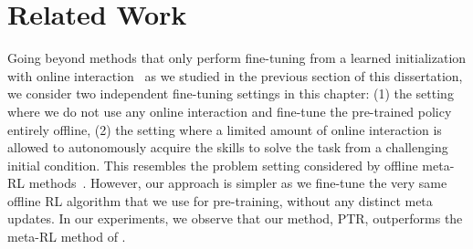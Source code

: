 \vspace{-0.2cm}
\section{Related Work}
\label{sec:ptr_related}
\vspace{-0.2cm}



Going beyond methods that only perform fine-tuning from a learned initialization with online interaction~\citep{nair2020accelerating,kostrikov2021iql,lee2022offline} as we studied in the previous section of this dissertation, we consider two independent fine-tuning settings in this chapter: (1) the setting where we do not use any online interaction and fine-tune the pre-trained policy entirely offline, (2) the setting where a limited amount of online interaction is allowed to autonomously acquire the skills to solve the task from a challenging initial condition. This resembles the problem setting considered by offline meta-RL methods~\citep{li2019multi, dorfman2020offline, mitchell2021offline, pong2021offline,lin2022model}. However, our approach is simpler as we fine-tune the very same offline RL algorithm that we use for pre-training, without any distinct meta updates. In our experiments, we observe that our method, PTR, outperforms the meta-RL method of \citet{mitchell2021offline}. 

